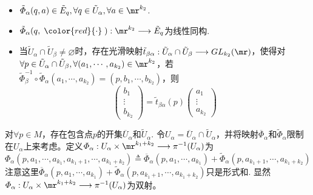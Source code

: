 \begin{itemize}
	\item[(1)] $\tilde{\varPhi}_{\alpha}(q,a)\in \tilde{E}_{q},\forall q\in \tilde{U}_{\alpha},\forall a\in \mr^{k_{2}}$.
	\item[(2)] $\tilde{\varPhi}_{\alpha}(q,\;{\color{red}{\cdot}}\;):\mr^{k_{2}}\longrightarrow \tilde{E}_{q}$为线性同构.
	\item[(3)] 当$\tilde{U}_{\alpha}\cap \tilde{U}_{\beta}\neq\varnothing$时，存在光滑映射$\tilde{t}_{\beta\alpha}:\tilde{U}_{\alpha}\cap \tilde{U}_{\beta}\longrightarrow GL_{k_{2}}(\mr)$，使得对$\forall p\in \tilde{U}_{\alpha}\cap \tilde{U}_{\beta},\forall (a_{1},\cdots,a_{k_{2}})\in \mr^{k_{2}}$，若$\tilde{\varPhi}_{\beta}^{-1}\circ\tilde{\varPhi}_{\alpha}(a_{1},\cdots,a_{k_{2}})=(p,b_{1},\cdots,b_{k_{2}})$，则
	\[
	\left( \begin{array}{ccc}{b_{1}} \\ {\vdots}  \\ {b_{k_{2}}} \end{array}\right)=\tilde{t}_{\beta\alpha}(p) \left( \begin{array}{ccc}{a_{1}} \\ {\vdots}  \\ {a_{k_{2}}} \end{array}\right)
	\]
\end{itemize}

对$\forall p\in M$，存在包含点$p$的开集$\overline{U}_{\alpha}$和$\tilde{U}_{\alpha}$. 令$U_{\alpha}=\overline{U}_{\alpha}\cap \tilde{U}_{\alpha}$，并将映射$\overline{\varPhi}_{\alpha}$和$\tilde{\varPhi}_{\alpha}$限制在$U_{\alpha}$上来考虑。定义$\varPhi_{\alpha}:U_{\alpha}\times \mr^{k_{1}+k_{2}} \longrightarrow \pi^{-1}(U_{\alpha})$为
\[
\varPhi_{\alpha}(p,a_{1},\cdots,a_{k_{1}},a_{k_{1}+1},\cdots,a_{k_{1}+k_{2}})\triangleq  \overline{\varPhi}_{\alpha}(p,a_{1},\cdots,a_{k_{1}})+\tilde{\varPhi}_{\alpha}(p,a_{k_{1}+1},\cdots,a_{k_{1}+k_{2}})
\]
注意这里$\overline{\varPhi}_{\alpha}(p,a_{1},\cdots,a_{k_{1}})+\tilde{\varPhi}_{\alpha}(p,a_{k_{1}+1},\cdots,a_{k_{1}+k_{2}})$只是形式和. 显然$\varPhi_{\alpha}:U_{\alpha}\times \mr^{k_{1}+k_{2}} \longrightarrow \pi^{-1}(U_{\alpha})$为双射。


